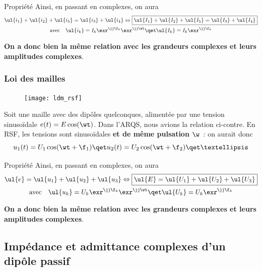 \documentclass[../main/main.tex]{subfiles}
\begin{document}
\begin{rprop}{Propriété}
    Ainsi, en passant en complexes, on aura
    \begin{gather*}
        \ul{i_1} + \ul{i_2} + \ul{i_5} = \ul{i_3} + \ul{i_4}
        \Leftrightarrow
        \boxed{\ul{I_1} + \ul{I_2} + \ul{I_5} = \ul{I_3} + \ul{I_4}}\\
        \text{avec}\quad
        \ul{i_k} = I_k\exr^{\jj\f_k}\exr^{\jj\wt}
        \qet
        \ul{I_k} = I_k\exr^{\jj\f_k}
    \end{gather*}
    \begin{center}
        \textbf{On a donc bien la même relation avec les grandeurs complexes et
        leurs amplitudes complexes}.
    \end{center}
\end{rprop}

\subsubsection{Loi des mailles}
\begin{figure}
    \vspace*{-30pt}
    \centering
    \texttt{[image: ldm\_rsf]}
\end{figure}
Soit une maille avec des dipôles quelconques, alimentée par une tension
sinusoïdale $e(t) = E\cos(\wt)$. Dans l'ARQS, nous avions la relation ci-contre.
En RSF, les tensions sont sinusoïdales \textbf{et de même pulsation} $\w$~: on
aurait donc
\[
    u_1(t) = U_1\cos(\wt+\f_1)
    \qet
    u_2(t) = U_2\cos(\wt+\f_2)
    \qet
    …
\]

\begin{rprop}{Propriété}
    Ainsi, en passant en complexes, on aura
    \begin{gather*}
        \ul{e} = \ul{u_1} + \ul{u_2} + \ul{u_3}
        \Leftrightarrow
        \boxed{\ul{E} = \ul{U_1} + \ul{U_2} + \ul{U_3}}\\
        \text{avec}\quad
        \ul{u_k} = U_k\exr^{\jj\f_k}\exr^{\jj\wt}
        \qet
        \ul{U_k} = U_k\exr^{\jj\f_k}
    \end{gather*}
    \begin{center}
        \textbf{On a donc bien la même relation avec les grandeurs complexes et
        leurs amplitudes complexes}.
    \end{center}
\end{rprop}

\subsection{Impédance et admittance complexes d'un dipôle passif}
\end{document}
